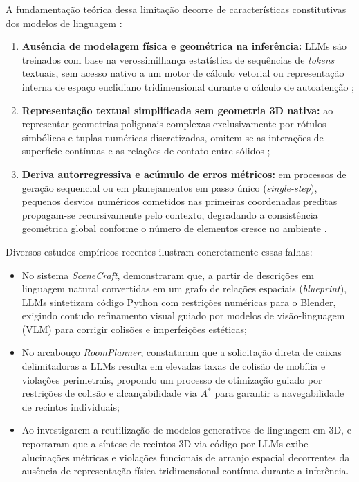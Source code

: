 A fundamentação teórica dessa limitação decorre de características constitutivas dos modelos de linguagem \cite{Gallotta_2024, hu2024scenecraft, sun2024roomplanner, feng2026repurposing3dgenerativemodel}:
\begin{enumerate}
    \item \textbf{Ausência de modelagem física e geométrica na inferência:} LLMs são treinados com base na verossimilhança estatística de sequências de \textit{tokens} textuais, sem acesso nativo a um motor de cálculo vetorial ou representação interna de espaço euclidiano tridimensional durante o cálculo de autoatenção \cite{Gallotta_2024, sun2024roomplanner};
    \item \textbf{Representação textual simplificada sem geometria 3D nativa:} ao representar geometrias poligonais complexas exclusivamente por rótulos simbólicos e tuplas numéricas discretizadas, omitem-se as interações de superfície contínuas e as relações de contato entre sólidos \cite{feng2026repurposing3dgenerativemodel};
    \item \textbf{Deriva autorregressiva e acúmulo de erros métricos:} em processos de geração sequencial ou em planejamentos em passo único (\textit{single-step}), pequenos desvios numéricos cometidos nas primeiras coordenadas preditas propagam-se recursivamente pelo contexto, degradando a consistência geométrica global conforme o número de elementos cresce no ambiente \cite{sun2024roomplanner, feng2026repurposing3dgenerativemodel, yang2026codeasroomgenerating3drooms}.
\end{enumerate}

Diversos estudos empíricos recentes ilustram concretamente essas falhas:
\begin{itemize}
    \item No sistema \textit{SceneCraft}, \textcite{hu2024scenecraft} demonstraram que, a partir de descrições em linguagem natural convertidas em um grafo de relações espaciais (\textit{blueprint}), LLMs sintetizam código Python com restrições numéricas para o Blender, exigindo contudo refinamento visual guiado por modelos de visão-linguagem (VLM) para corrigir colisões e imperfeições estéticas;
    \item No arcabouço \textit{RoomPlanner}, \textcite{sun2024roomplanner} constataram que a solicitação direta de caixas delimitadoras a LLMs resulta em elevadas taxas de colisão de mobília e violações perimetrais, propondo um processo de otimização guiado por restrições de colisão e alcançabilidade via $A^*$ para garantir a navegabilidade de recintos individuais;
    \item Ao investigarem a reutilização de modelos generativos de linguagem em 3D, \textcite{feng2026repurposing3dgenerativemodel} e \textcite{yang2026codeasroomgenerating3drooms} reportaram que a síntese de recintos 3D via código por LLMs exibe alucinações métricas e violações funcionais de arranjo espacial decorrentes da ausência de representação física tridimensional contínua durante a inferência.
\end{itemize}

